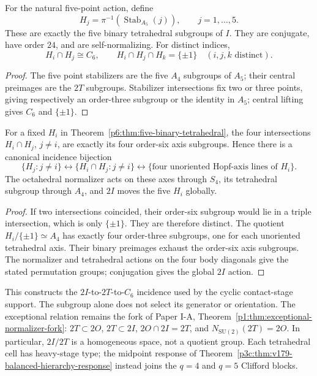 \documentclass[12pt,a4paper]{article}
\begin{document}
\begin{theorem}
\label{p6:thm:five-binary-tetrahedral}
For the natural five-point action, define
\[
H_j=\pi^{-1}(\operatorname{Stab}_{A_5}(j)),
\qquad j=1,\ldots,5.
\]
These are exactly the five binary tetrahedral subgroups of \(I\).  They are
conjugate, have order \(24\), and are self-normalizing.  For distinct
indices,
\[
H_i\cap H_j\cong C_6,
\qquad
H_i\cap H_j\cap H_k=\{\pm1\}
\quad(i,j,k\text{ distinct}).
\]
\end{theorem}

\begin{proof}
The five point stabilizers are the five \(A_4\) subgroups of \(A_5\);
their central preimages are the \(2T\) subgroups.  Stabilizer intersections
fix two or three points, giving respectively an order-three subgroup or the
identity in \(A_5\); central lifting gives \(C_6\) and \(\{\pm1\}\).
\end{proof}

\begin{corollary}
\label{p6:cor:v179-cell-intersection-hopf-axes}
For a fixed \(H_i\) in Theorem~\ref{p6:thm:five-binary-tetrahedral},
the four intersections \(H_i\cap H_j\), \(j\ne i\), are exactly its four
order-six axis subgroups.  Hence there is a canonical incidence bijection
\[
 \{H_j:j\ne i\}
 \longleftrightarrow\{H_i\cap H_j:j\ne i\}
 \longleftrightarrow
 \{\text{four unoriented Hopf-axis lines of }H_i\}.
\]
The octahedral normalizer acts on these axes through \(S_4\), its
tetrahedral subgroup through \(A_4\), and \(2I\) moves the five \(H_i\)
globally.
\end{corollary}
\begin{proof}
If two intersections coincided, their order-six subgroup would lie in a
triple intersection, which is only \(\{\pm1\}\).  They are therefore
distinct.  The quotient \(H_i/\{\pm1\}\simeq A_4\) has exactly four
order-three subgroups, one for each unoriented tetrahedral axis.
Their binary preimages exhaust the order-six axis subgroups.
The normalizer and tetrahedral actions on the four body diagonals give
the stated permutation groups; conjugation gives the global \(2I\) action.
\end{proof}

This constructs the \(2I\)-to-\(2T\)-to-\(C_6\) incidence used by the
cyclic contact-stage support.  The subgroup alone does not select its
generator or orientation.  The exceptional relation remains the fork of
Paper I-A, Theorem~\ref{p1:thm:exceptional-normalizer-fork}:
\(2T\subset2O\), \(2T\subset2I\), \(2O\cap2I=2T\), and
\(N_{\mathrm{SU}(2)}(2T)=2O\).  In particular, \(2I/2T\) is a
homogeneous space, not a quotient group.
Each tetrahedral cell has heavy-stage type; the midpoint response of
Theorem~\ref{p3c:thm:v179-balanced-hierarchy-response} instead joins the
\(q=4\) and \(q=5\) Clifford blocks.
\end{document}
